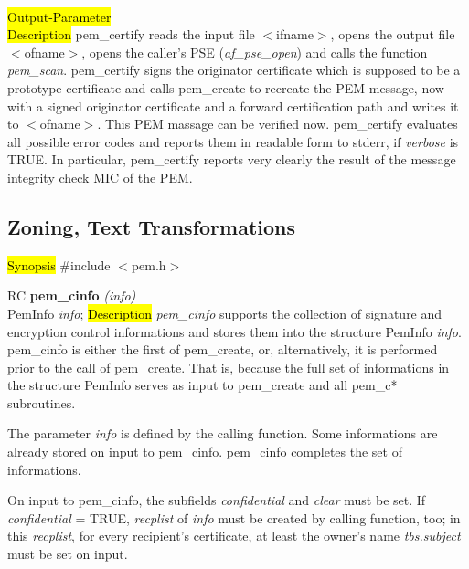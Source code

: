 
 \\
\hl{Output-Parameter}
 \\
\hl{Description}
pem\_certify reads the input file $<$ifname$>$,
opens the output file $<$ofname$>$,
opens the caller's PSE ({\em af\_pse\_open})
and calls the function {\em pem\_scan}.
pem\_certify signs the originator certificate which is supposed to be 
a prototype certificate and calls
pem\_create to recreate the PEM message, now with a
signed originator certificate and a forward certification path
and writes it to $<$ofname$>$.
This PEM massage  can be verified now.
pem\_certify evaluates all possible error codes and reports
them in readable form to stderr, if {\em verbose } is TRUE.
In particular, pem\_certify reports very clearly
the result of the message integrity check MIC of the PEM.
\subsection{Zoning, Text Transformations}
\label{pem_cinfo}
\hl{Synopsis}
\#include $<$pem.h$>$ 

RC {\bf pem\_cinfo} {\em (info)} \\
PemInfo {\em *info};
\hl{Description}
{\em pem\_cinfo} supports the collection of signature and
encryption control informations and stores them into
the structure PemInfo {\em info}.
pem\_cinfo is either the first of pem\_create,
or, alternatively, it is performed prior to the call of pem\_create.
That is, because the full set of informations in the structure PemInfo
serves as input to pem\_create and all pem\_c* subroutines.


The parameter {\em info} is defined by the calling function.
Some informations are already stored on input to pem\_cinfo.
pem\_cinfo completes the set of informations.


On input to pem\_cinfo, the subfields {\em confidential} and {\em clear}
must be set. If {\em confidential} = TRUE,
{\em recplist} of {\em info} must be created by calling function, too;
in this {\em recplist},
for every recipient's certificate, at least
the owner's name {\em tbs.subject} must be set on input.


